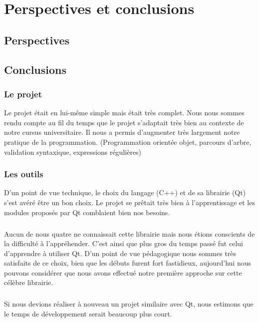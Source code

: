 \chapter{Perspectives et conclusions}
\section{Perspectives}

\section{Conclusions}

\subsection{Le projet}
Le projet était en lui-même simple mais était très complet. Nous nous sommes rendu compte au fil du temps que le projet s'adaptait très bien au contexte de notre cursus universitaire. Il nous a permis d'augmenter très largement notre pratique de la programmation. (Programmation orientée objet, parcours d’arbre, validation syntaxique, expressions régulières)


\subsection{Les outils}
D'un point de vue technique, le choix du langage (C++) et de sa librairie (Qt) s’est avéré être un bon choix. Le projet se prêtait très bien à l’apprentissage et les modules proposés par Qt comblaient bien nos besoins.

\paragraph{}
Aucun de nous quatre ne connaissait cette librairie mais nous étions conscients de la difficulté à l'appréhender. C'est ainsi que plus gros du temps passé fut celui d'apprendre à utiliser Qt. D'un point de vue pédagogique nous sommes très satisfaits de ce choix, bien que les débuts furent fort fastidieux, aujourd'hui nous pouvons considérer que nous avons effectué notre première approche sur cette célèbre librairie.
\paragraph{}

Si nous devions réaliser à nouveau un projet similaire avec Qt, nous estimons que le temps de développement serait beaucoup plus court.

